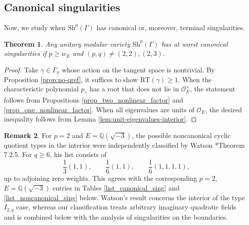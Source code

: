 \documentclass[11pt]{amsart}
\theoremstyle{plain}
\newtheorem{thm}{Theorem}[section]
\theoremstyle{definition}
\newtheorem{rem}[thm]{Remark}
\numberwithin{equation}{section}
\def\OO{\mathscr{O}}
\begin{document}
\subsection{Canonical singularities}
Now, we study when $\mathrm{Sh}^0(\Gamma)$ has canonical or, moreover, terminal singularities.

\begin{thm}\label{thm_classif_sing_disc<-4}
Any unitary modular variety $\mathrm{Sh}^0(\Gamma)$ has at worst canonical singularities if $p\geq w_E$ and $(p,q) \neq (2,2), (2,3)$.
\end{thm}
\begin{proof}
Take $\gamma\in \Gamma_x$ whose action on the tangent space is nontrivial. 
By Proposition \ref{prop:no-qref}, it suffices to show $\mathrm{RT}(\gamma) \geq 1$.
When the characteristic polynomial $p_\gamma$ has a root that does not lie in $\OO_E^\times$, the statement follows from Propositions \ref{prop_two_nonlinear_factor} and \ref{prop_one_nonlinear_factor}. 
When all eigenvalues are units of $\OO_E$, the desired inequality follows from Lemma \ref{lem:unit-eigenvalues-interior}.
\end{proof}

\begin{rem}
For $p=2$ and $E=\mathbb Q(\sqrt{-3})$, the possible
noncanonical cyclic quotient types in the interior were
independently classified by Watson
\cite{watson2026singularities}*{Theorem 7.2.5}.
For $q\geq 6$, his list consists of
\[
  \frac{1}{3}(1,1),\qquad
  \frac{1}{6}(1,1),\qquad
  \frac{1}{6}(1,1,1,1),
\]
up to adjoining zero weights.  This agrees with the
corresponding $p=2$, $E=\mathbb Q(\sqrt{-3})$ entries in
Tables \ref{list_canonical_sing}
and \ref{list_noncanonical_sing} below.
Watson's result concerns the interior of the type
$I_{2,q}$ case,
whereas our classification treats arbitrary
imaginary quadratic fields and is combined below with the analysis of singularities on the boundaries.
\end{rem}
\end{document}
